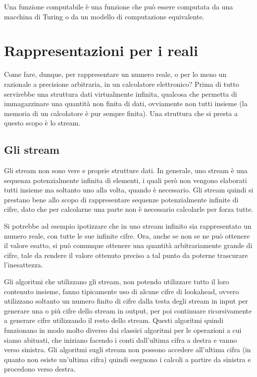 \documentclass[Lau,oneside]{sapthesis}
\begin{document}
Una funzione computabile è una funzione che può essere computata da una macchina di Turing o da un modello di computazione equivalente.


\section{Rappresentazioni per i reali}
Come fare, dunque, per rappresentare un numero reale, o per lo meno un razionale 
a precisione arbitraria, in un calcolatore elettronico? Prima di tutto 
servirebbe una struttura dati virtualmente infinita, qualcosa che permetta di 
immagazzinare una quantità non finita di dati, ovviamente non tutti insieme (la 
memoria di un calcolatore è pur sempre finita). Una struttura che si presta a 
questo scopo è lo stream.


\subsection{Gli stream}
Gli stream non sono vere e proprie strutture dati. In generale, uno stream è una 
sequenza potenzialmente infinita di elementi, i quali però non vengono elaborati tutti insieme ma 
soltanto uno alla volta, quando è necessario. Gli stream quindi si prestano bene 
allo scopo di rappresentare sequenze potenzialmente infinite di cifre, dato che 
per calcolarne una parte non è necessario calcolarle per forza tutte.

Si potrebbe ad esempio ipotizzare che in uno stream infinito sia rappresentato 
un numero reale, con tutte le sue infinite cifre. Ora, anche se non se ne può 
ottenere il valore esatto, si può comunque ottenere una quantità arbitrariamente 
grande di cifre, tale da rendere il valore ottenuto preciso a tal punto da 
poterne trascurare l'inesattezza.

Gli algoritmi che utilizzano gli stream, non potendo utilizzare tutto il loro 
contenuto insieme, fanno tipicamente uso di alcune cifre di lookahead, ovvero 
utilizzano soltanto un numero finito di cifre dalla testa degli stream in input 
per generare una o più cifre dello stream in output, per poi continuare 
ricorsivamente a generare cifre utilizzando il resto dello stream. Questi 
algoritmi quindi funzionano in modo molto diverso dai classici algoritmi per le 
operazioni a cui siamo abituati, che iniziano facendo i conti dall'ultima cifra 
a destra e vanno verso sinistra. Gli algoritmi sugli stream non possono accedere 
all'ultima cifra (in quanto non esiste un'ultima cifra) quindi eseguono i 
calcoli a partire da sinistra e procedono verso destra.
\end{document}
